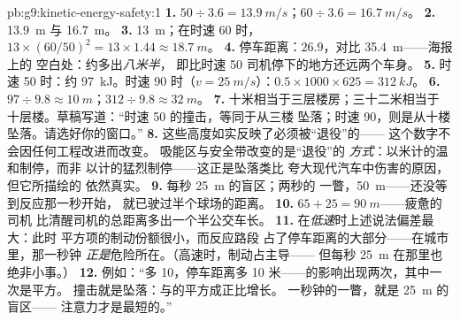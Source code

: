 \begin{solution}{pb:g9:kinetic-energy-safety:1}
\textbf{1.} $50 \div 3.6 = \qty{13.9}{m/s}$；$60 \div 3.6 =
\qty{16.7}{m/s}$。
\textbf{2.} \qty{13.9}{m} 与 \qty{16.7}{m}。
\textbf{3.} \qty{13}{m}；在时速 60 时，$13 \times (60/50)^2 =
13 \times 1.44 \approx \qty{18.7}{m}$。
\textbf{4.} 停车距离：$26.9$，对比 \qty{35.4}{m}——海报上的
空白处：约多出\emph{八米半}，
即比时速 50 司机停下的地方还远两个车身。
\textbf{5.} 时速 50 时：约 \qty{97}{kJ}。时速 90 时（$v =
\qty{25}{m/s}$）：$0.5 \times 1000 \times 625 =
\qty{312}{kJ}$。
\textbf{6.} $97 \div 9.8 \approx \qty{10}{m}$；$312 \div 9.8
\approx \qty{32}{m}$。
\textbf{7.} 十米相当于三层楼房；三十二米相当于
十层楼。草稿写道：“时速 50 的撞击，等同于从三楼
坠落；时速 90，则是从十楼坠落。请选好你的窗口。”
\textbf{8.} 这些高度如实反映了必须被“退役”的——
这个数字不会因任何工程改进而改变。
吸能区与安全带改变的是“退役”的
\emph{方式}：以米计的温和制停，而非
以计的猛烈制停——这正是坠落类比
夸大现代汽车中伤害的原因，但它所描绘的
依然真实。
\textbf{9.} 每秒 \qty{25}{m} 的盲区；两秒的
一瞥，\qty{50}{m}——还没等到反应那一秒开始，
就已驶过半个球场的距离。
\textbf{10.} $65 + 25 = \qty{90}{m}$——疲惫的司机
比清醒司机的总距离多出一个半公交车长。
\textbf{11.} 在\emph{低速}时上述说法偏差最大：此时
平方项的制动份额很小，而反应路段
占了停车距离的大部分——在城市里，那一秒钟
\emph{正是}危险所在。（高速时，制动占主导——
但每秒 \qty{25}{m} 在那里也绝非小事。）
\textbf{12.} 例如：“多 10，停车距离多
10 米——的影响出现两次，其中一次是平方。
撞击就是坠落：与的平方成正比增长。
一秒钟的一瞥，就是 \qty{25}{m} 的盲区——
注意力才是最短的。”
\end{solution}
